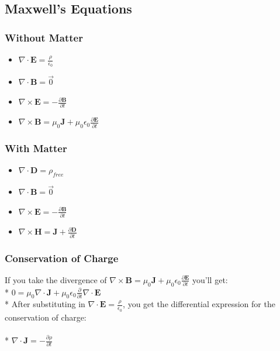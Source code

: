 \subsection{Maxwell's Equations}

\subsubsection{Without Matter}
\begin{itemize}
\item \(\displaystyle\nabla\cdot\mathbf{E}=\frac{\rho}{\epsilon_0}\)
\item \(\displaystyle\nabla\cdot\mathbf{B}=\vec{0}\)
\item \(\displaystyle\nabla\times\mathbf{E}=-\frac{\partial\mathbf{B}}{\partial t}\)
\item \(\displaystyle\nabla\times\mathbf{B}=\mu_0\mathbf{J}+\mu_0\epsilon_0\frac{\partial\mathbf{E}}{\partial t}\)
\end{itemize}

\subsubsection{With Matter}
\begin{itemize}
\item \(\displaystyle\nabla\cdot\mathbf{D}=\rho_{free}\)
\item \(\displaystyle\nabla\cdot\mathbf{B}=\vec{0}\)
\item \(\displaystyle\nabla\times\mathbf{E}=-\frac{\partial\mathbf{B}}{\partial t}\)
\item \(\displaystyle\nabla\times\mathbf{H}=\mathbf{J}+\frac{\partial\mathbf{D}}{\partial t}\)
\end{itemize}

\subsubsection{Conservation of Charge}
If you take the divergence of \(\displaystyle\nabla\times\mathbf{B}=\mu_0\mathbf{J}+\mu_0\epsilon_0\frac{\partial\mathbf{E}}{\partial t}\) you'll get:\\*
\(\displaystyle 0=\mu_0\nabla\cdot\mathbf{J}+\mu_0\epsilon_0\frac{\partial}{\partial t}\nabla\cdot\mathbf{E}\)\\*
After substituting in \(\displaystyle\nabla\cdot\mathbf{E}=\frac{\rho}{\epsilon_0}\), you get the differential expression for the conservation of charge:\\\\*
\(\displaystyle \nabla\cdot\mathbf{J}=-\frac{\partial\rho}{\partial t}\)

